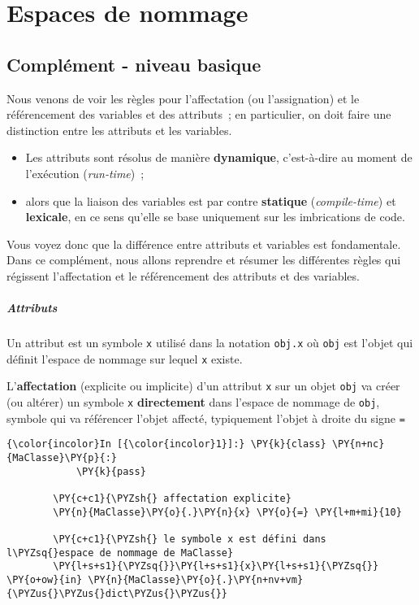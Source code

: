     
    
    
    

    

    \hypertarget{espaces-de-nommage}{%
\section{Espaces de nommage}\label{espaces-de-nommage}}

    \hypertarget{compluxe9ment---niveau-basique}{%
\subsection{Complément - niveau
basique}\label{compluxe9ment---niveau-basique}}

    Nous venons de voir les règles pour l'affectation (ou l'assignation) et
le référencement des variables et des attributs~; en particulier, on
doit faire une distinction entre les attributs et les variables.

    \begin{itemize}
\tightlist
\item
  Les attributs sont résolus de manière \textbf{dynamique}, c'est-à-dire
  au moment de l'exécution (\emph{run-time})~;
\item
  alors que la liaison des variables est par contre \textbf{statique}
  (\emph{compile-time}) et \textbf{lexicale}, en ce sens qu'elle se base
  uniquement sur les imbrications de code.
\end{itemize}

    Vous voyez donc que la différence entre attributs et variables est
fondamentale. Dans ce complément, nous allons reprendre et résumer les
différentes règles qui régissent l'affectation et le référencement des
attributs et des variables.

    \hypertarget{attributs}{%
\subparagraph{Attributs}\label{attributs}}

    Un attribut est un symbole \texttt{x} utilisé dans la notation
\texttt{obj.x} où \texttt{obj} est l'objet qui définit l'espace de
nommage sur lequel \texttt{x} existe.

L'\textbf{affectation} (explicite ou implicite) d'un attribut \texttt{x}
sur un objet \texttt{obj} va créer (ou altérer) un symbole \texttt{x}
\textbf{directement} dans l'espace de nommage de \texttt{obj}, symbole
qui va référencer l'objet affecté, typiquement l'objet à droite du signe
\texttt{=}

    \begin{Verbatim}[commandchars=\\\{\}]
{\color{incolor}In [{\color{incolor}1}]:} \PY{k}{class} \PY{n+nc}{MaClasse}\PY{p}{:}
            \PY{k}{pass}
        
        \PY{c+c1}{\PYZsh{} affectation explicite}
        \PY{n}{MaClasse}\PY{o}{.}\PY{n}{x} \PY{o}{=} \PY{l+m+mi}{10} 
        
        \PY{c+c1}{\PYZsh{} le symbole x est défini dans l\PYZsq{}espace de nommage de MaClasse}
        \PY{l+s+s1}{\PYZsq{}}\PY{l+s+s1}{x}\PY{l+s+s1}{\PYZsq{}} \PY{o+ow}{in} \PY{n}{MaClasse}\PY{o}{.}\PY{n+nv+vm}{\PYZus{}\PYZus{}dict\PYZus{}\PYZus{}}
\end{Verbatim}


